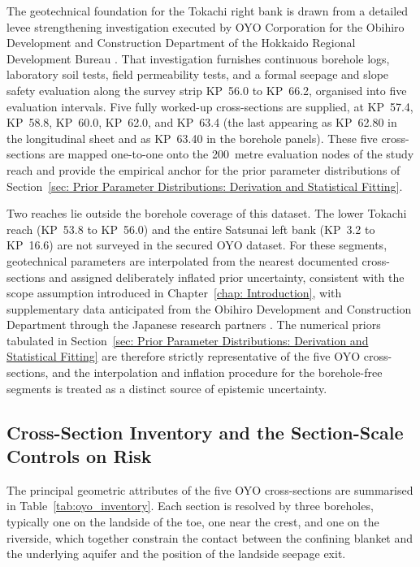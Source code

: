 The geotechnical foundation for the Tokachi right bank is drawn from a detailed levee strengthening investigation executed by OYO Corporation for the Obihiro Development and Construction Department of the Hokkaido Regional Development Bureau \parencite{oyo_1999}. That investigation furnishes continuous borehole logs, laboratory soil tests, field permeability tests, and a formal seepage and slope safety evaluation along the survey strip KP~56.0 to KP~66.2, organised into five evaluation intervals. Five fully worked-up cross-sections are supplied, at KP~57.4, KP~58.8, KP~60.0, KP~62.0, and KP~63.4 (the last appearing as KP~62.80 in the longitudinal sheet and as KP~63.40 in the borehole panels). These five cross-sections are mapped one-to-one onto the 200~metre evaluation nodes of the study reach and provide the empirical anchor for the prior parameter distributions of Section~\ref{sec: Prior Parameter Distributions: Derivation and Statistical Fitting}.

Two reaches lie outside the borehole coverage of this dataset. The lower Tokachi reach (KP~53.8 to KP~56.0) and the entire Satsunai left bank (KP~3.2 to KP~16.6) are not surveyed in the secured OYO dataset. For these segments, geotechnical parameters are interpolated from the nearest documented cross-sections and assigned deliberately inflated prior uncertainty, consistent with the scope assumption introduced in Chapter~\ref{chap: Introduction}, with supplementary data anticipated from the Obihiro Development and Construction Department through the Japanese research partners \parencite{fukuda_2025_internal}. The numerical priors tabulated in Section~\ref{sec: Prior Parameter Distributions: Derivation and Statistical Fitting} are therefore strictly representative of the five OYO cross-sections, and the interpolation and inflation procedure for the borehole-free segments is treated as a distinct source of epistemic uncertainty.

\subsection{Cross-Section Inventory and the Section-Scale Controls on Risk}
\label{subsec: Cross-Section Inventory and the Foreshore-Width Control on Risk}

The principal geometric attributes of the five OYO cross-sections are summarised in Table~\ref{tab:oyo_inventory}. Each section is resolved by three boreholes, typically one on the landside of the toe, one near the crest, and one on the riverside, which together constrain the contact between the confining blanket and the underlying aquifer and the position of the landside seepage exit.

